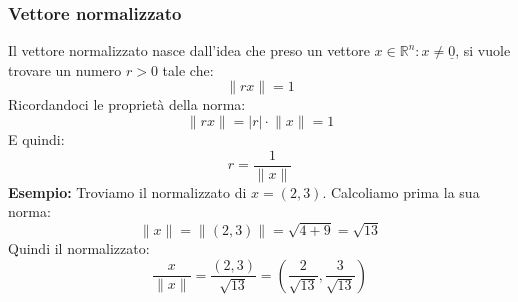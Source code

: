 \subsubsection{Vettore normalizzato}
Il vettore normalizzato nasce dall'idea che preso un vettore $x \in 
\mathbb{R}^n: x \neq \underline{0}$, si vuole trovare un numero $r > 0$ tale 
che:
\begin{equation*}
	\lVert rx \rVert = 1
\end{equation*}
Ricordandoci le proprietà della norma: 
\begin{equation*}
	\lVert rx \rVert = |r| \cdot \lVert x \rVert = 1
\end{equation*}
E quindi:
\begin{equation*}
	r = \dfrac{1}{\lVert x \rVert}
\end{equation*}
\textbf{Esempio:} Troviamo il normalizzato di $x = (2, 3)$. Calcoliamo prima 
la sua norma:
\begin{equation*}
	\lVert x \rVert = \lVert (2, 3) \rVert = \sqrt{4+9} = \sqrt{13}
\end{equation*}
Quindi il normalizzato:
\begin{equation*}
	\dfrac{x}{\lVert x \rVert} = \dfrac{(2, 3)}{\sqrt{13}} = \left(\dfrac{2}{
        \sqrt{13}}, \dfrac{3}{\sqrt{13}}\right)
\end{equation*}

